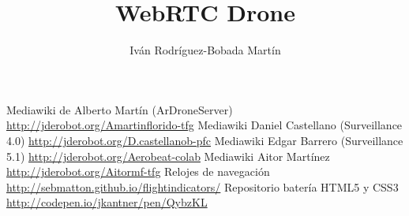 \documentclass[oneside,a4paper,12pt]{book}
\title{WebRTC Drone}
\author{Iván Rodríguez-Bobada Martín}
\begin{document}






\begin{thebibliography}{99}

 Mediawiki de Alberto Martín (ArDroneServer) \url{http://jderobot.org/Amartinflorido-tfg}
 Mediawiki Daniel Castellano (Surveillance 4.0) \url{http://jderobot.org/D.castellanob-pfc} 
 Mediawiki Edgar Barrero (Surveillance 5.1) \url{http://jderobot.org/Aerobeat-colab}
 Mediawiki Aitor Martínez \url{http://jderobot.org/Aitormf-tfg}
 Relojes de navegación \url{http://sebmatton.github.io/flightindicators/}
 Repositorio batería HTML5 y CSS3 \url{http://codepen.io/jkantner/pen/QybzKL}

\end{thebibliography} 
\end{document}
